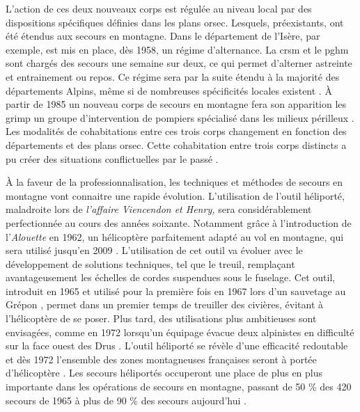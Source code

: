 L'action de ces deux nouveaux corps est régulée au niveau local par
des dispositions spécifiques définies dans les plans
\ac{orsec}. Lesquels, préexistants, ont été étendus aux secours en
montagne. Dans le département de l'Isère, par exemple, est mis en
place, dès 1958, un régime d'alternance. La \ac{crsm} et le \ac{pghm}
sont chargés des secours une semaine sur deux, ce qui permet
d'alterner astreinte et entrainement ou repos. Ce régime sera par la
suite étendu à la majorité des départements Alpins, même si de
nombreuses spécificités locales existent \autocite{Halle2007}. À partir
de 1985 un nouveau corps de secours en montagne fera son apparition
les \ac{grimp} un groupe d'intervention de pompiers spécialisé dans
les milieux périlleux \autocite{CFDLD}. Les modalités de cohabitations
entre ces trois corps changement en fonction des départements et des
plans \ac{orsec}.
Cette cohabitation entre trois corps distincts a pu créer des
situations conflictuelles par le passé \autocite{Soule2002,
  Ganser2012}.

À la faveur de la professionnalisation, les techniques et méthodes de
secours en montagne vont connaitre une rapide évolution. L'utilisation
de l'outil héliporté, maladroite lors de \emph{l'affaire Viencendon et
  Henry,} sera considérablement perfectionnée au cours des années
soixante. Notamment grâce à l'introduction de l'\emph{Alouette
  } en 1962, un hélicoptère parfaitement adapté au vol en
montagne, qui sera utilisé jusqu'en 2009 \autocite{Elie2006, Lafond,
  Lafond2011b}. L'utilisation de cet outil va évoluer avec le
développement de solutions techniques, tel que le treuil, remplaçant
avantageusement les échelles de cordes suspendues sous le
fuselage. Cet outil, introduit en 1965 et utilisé pour la première
fois en 1967 lors d'un sauvetage au Grépon \autocite{Lafond2011a},
permet dans un premier temps de treuiller des civières, évitant à
l'hélicoptère de se poser. Plus tard, des utilisations plus
ambitieuses sont envisagées, comme en 1972 lorsqu'un équipage évacue
deux alpinistes en difficulté sur la face ouest des Drus
\autocite{Ministere2013}. L'outil héliporté se révèle d'une efficacité
redoutable et dès 1972 l'ensemble des zones montagneuses françaises
seront à portée d'hélicoptère \autocite{CFDLD}. Les secours héliportés
occuperont une place de plus en plus importante dans les opérations de
secours en montagne, passant de 50 \% des 420 secours de 1965
\autocite{CFDLD} à plus de 90 \% des secours aujourd'hui
\autocite{Halle2007}.

